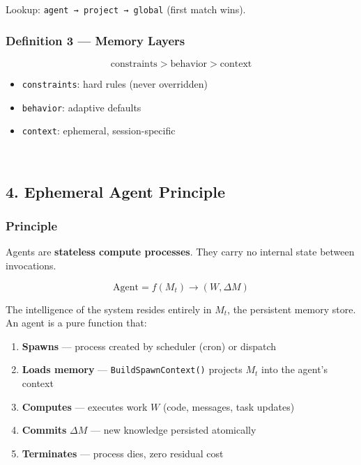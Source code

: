 \documentclass[11pt]{article}
\providecommand{\tightlist}{%
      \setlength{\itemsep}{0pt}\setlength{\parskip}{0pt}}
\begin{document}
Lookup: \texttt{agent\ →\ project\ →\ global} (first match wins).

\subsubsection{Definition 3 --- Memory
Layers}\label{definition-3-memory-layers}

\[\text{constraints} > \text{behavior} > \text{context}\]

\begin{itemize}
\tightlist
\item
  \texttt{constraints}: hard rules (never overridden)
\item
  \texttt{behavior}: adaptive defaults
\item
  \texttt{context}: ephemeral, session-specific
\end{itemize}

    \begin{center}
    \end{center}
    { \hspace*{\fill} \\}
    
    \subsection{4. Ephemeral Agent
Principle}\label{ephemeral-agent-principle}

\subsubsection{Principle}\label{principle}

Agents are \textbf{stateless compute processes}. They carry no internal
state between invocations.

\[\text{Agent} = f(M_t) \rightarrow (W, \Delta M)\]

The intelligence of the system resides entirely in \(M_t\), the
persistent memory store. An agent is a pure function that:

\begin{enumerate}
\def\labelenumi{\arabic{enumi}.}
\tightlist
\item
  \textbf{Spawns} --- process created by scheduler (cron) or dispatch
\item
  \textbf{Loads memory} --- \texttt{BuildSpawnContext()} projects
  \(M_t\) into the agent's context
\item
  \textbf{Computes} --- executes work \(W\) (code, messages, task
  updates)
\item
  \textbf{Commits} \(\Delta M\) --- new knowledge persisted atomically
\item
  \textbf{Terminates} --- process dies, zero residual cost
\end{enumerate}
\end{document}
